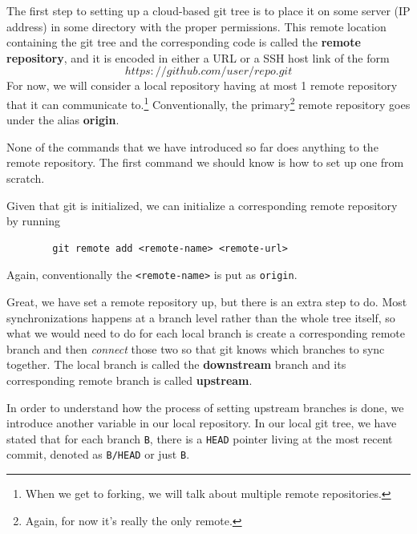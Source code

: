 \documentclass{article}
\begin{document}
    \begin{definition}
      The first step to setting up a cloud-based git tree is to place it on some server (IP address) in some directory with the proper permissions. This remote location containing the git tree and the corresponding code is called the \textbf{remote repository}, and it is encoded in either a URL or a SSH host link of the form 
      \begin{equation}
        https://github.com/user/repo.git
      \end{equation} 
      For now, we will consider a local repository having at most 1 remote repository that it can communicate to.\footnote{When we get to forking, we will talk about multiple remote repositories.} Conventionally, the primary\footnote{Again, for now it's really the only remote.} remote repository goes under the alias \textbf{origin}. 
    \end{definition}  

    None of the commands that we have introduced so far does anything to the remote repository. The first command we should know is how to set up one from scratch. 

    \begin{definition}
      Given that git is initialized, we can initialize a corresponding remote repository by running 
      \begin{lstlisting}
        git remote add <remote-name> <remote-url>
      \end{lstlisting}
      Again, conventionally the \texttt{<remote-name>} is put as \texttt{origin}. 
    \end{definition} 

    Great, we have set a remote repository up, but there is an extra step to do. Most synchronizations happens at a branch level rather than the whole tree itself, so what we would need to do for each local branch is create a corresponding remote branch and then \textit{connect} those two so that git knows which branches to sync together. The local branch is called the \textbf{downstream} branch and its corresponding remote branch is called \textbf{upstream}. 

    In order to understand how the process of setting upstream branches is done, we introduce another variable in our local repository. In our local git tree, we have stated that for each branch \texttt{B}, there is a \texttt{HEAD} pointer living at the most recent commit, denoted as \texttt{B/HEAD} or just \texttt{B}. 
\end{document}
